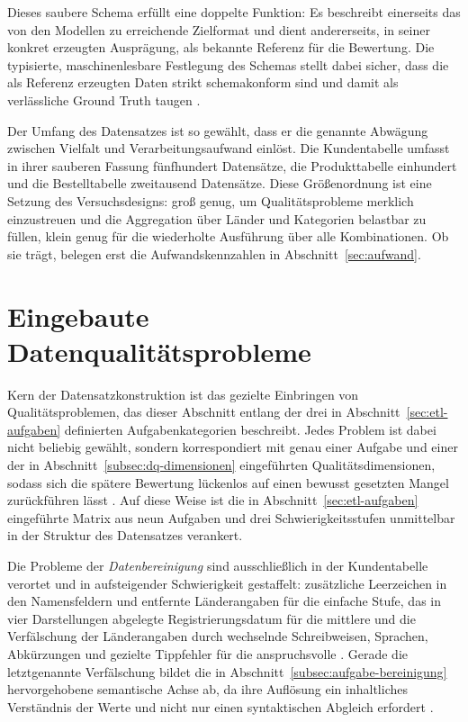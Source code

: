 Dieses saubere Schema erfüllt eine doppelte Funktion: Es beschreibt einerseits das von den Modellen zu erreichende Zielformat und dient andererseits, in seiner konkret erzeugten Ausprägung, als bekannte Referenz für die Bewertung. Die typisierte, maschinenlesbare Festlegung des Schemas stellt dabei sicher, dass die als Referenz erzeugten Daten strikt schemakonform sind und damit als verlässliche Ground Truth taugen \autocite{ridzuanReviewDataQuality2024,rangineniReviewEnhancingData2023}.

Der Umfang des Datensatzes ist so gewählt, dass er die genannte Abwägung zwischen Vielfalt und Verarbeitungsaufwand einlöst. Die Kundentabelle umfasst in ihrer sauberen Fassung fünfhundert Datensätze, die Produkttabelle einhundert und die Bestelltabelle zweitausend Datensätze. Diese Größenordnung ist eine Setzung des Versuchsdesigns: groß genug, um Qualitätsprobleme merklich einzustreuen und die Aggregation über Länder und Kategorien belastbar zu füllen, klein genug für die wiederholte Ausführung über alle Kombinationen. Ob sie trägt, belegen erst die Aufwandskennzahlen in Abschnitt~\ref{sec:aufwand}.

\section{Eingebaute Datenqualitätsprobleme}
\label{sec:eingebaute-probleme}

Kern der Datensatzkonstruktion ist das gezielte Einbringen von Qualitätsproblemen, das dieser Abschnitt entlang der drei in Abschnitt~\ref{sec:etl-aufgaben} definierten Aufgabenkategorien beschreibt. Jedes Problem ist dabei nicht beliebig gewählt, sondern korrespondiert mit genau einer Aufgabe und einer der in Abschnitt~\ref{subsec:dq-dimensionen} eingeführten Qualitätsdimensionen, sodass sich die spätere Bewertung lückenlos auf einen bewusst gesetzten Mangel zurückführen lässt \autocite{ridzuanReviewDataQuality2024,coteDataCleaningMachine2024}. Auf diese Weise ist die in Abschnitt~\ref{sec:etl-aufgaben} eingeführte Matrix aus neun Aufgaben und drei Schwierigkeitsstufen unmittelbar in der Struktur des Datensatzes verankert.

Die Probleme der \emph{Datenbereinigung} sind ausschließlich in der Kundentabelle verortet und in aufsteigender Schwierigkeit gestaffelt: zusätzliche Leerzeichen in den Namensfeldern und entfernte Länderangaben für die einfache Stufe, das in vier Darstellungen abgelegte Registrierungsdatum für die mittlere und die Verfälschung der Länderangaben durch wechselnde Schreibweisen, Sprachen, Abkürzungen und gezielte Tippfehler für die anspruchsvolle \autocite{coteDataCleaningMachine2024,rangineniReviewEnhancingData2023}. Gerade die letztgenannte Verfälschung bildet die in Abschnitt~\ref{subsec:aufgabe-bereinigung} hervorgehobene semantische Achse ab, da ihre Auflösung ein inhaltliches Verständnis der Werte und nicht nur einen syntaktischen Abgleich erfordert \autocite{hassaniRoleChatGPTData2023,khanCognitiveETLUsing2025}.


